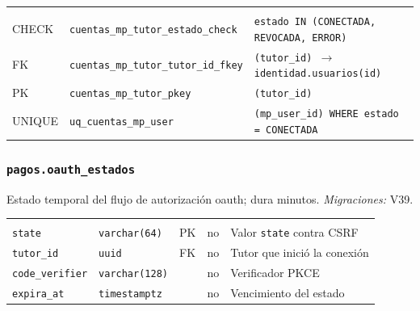 {\small
\begin{xltabular}{\textwidth}{@{}>{\raggedright\arraybackslash}p{1.7cm} >{\raggedright\arraybackslash}p{4.6cm} L@{}}
    \toprule
     &  &  \\
    \midrule
    \endfirsthead
    \toprule
     &  &  \\
    \midrule
    \endhead
    \bottomrule
    \endfoot
    CHECK & \texttt{cuentas\_\allowbreak{}mp\_\allowbreak{}tutor\_\allowbreak{}estado\_\allowbreak{}check} & \texttt{estado IN (\allowbreak{}\textquotesingle{}CONECTADA\textquotesingle{},\allowbreak{} \textquotesingle{}REVOCADA\textquotesingle{},\allowbreak{} \textquotesingle{}ERROR\textquotesingle{})} \\
    FK & \texttt{cuentas\_\allowbreak{}mp\_\allowbreak{}tutor\_\allowbreak{}tutor\_\allowbreak{}id\_\allowbreak{}fkey} & \texttt{(\allowbreak{}tutor\_\allowbreak{}id) $\rightarrow$ identidad.usuarios(\allowbreak{}id)} \\
    PK & \texttt{cuentas\_\allowbreak{}mp\_\allowbreak{}tutor\_\allowbreak{}pkey} & \texttt{(\allowbreak{}tutor\_\allowbreak{}id)} \\
    UNIQUE & \texttt{uq\_\allowbreak{}cuentas\_\allowbreak{}mp\_\allowbreak{}user} & \texttt{(\allowbreak{}mp\_\allowbreak{}user\_\allowbreak{}id) WHERE estado = \textquotesingle{}CONECTADA\textquotesingle{}} \\
\end{xltabular}
}

\subsubsection{\texorpdfstring{\texttt{pagos.oauth\_\allowbreak{}estados}}{pagos.oauth\_estados}}\label{dd:pagos.oauth_estados}

Estado temporal del flujo de autorización \gls{oauth}; dura minutos. \emph{Migraciones:} V39.

{\small
\begin{xltabular}{\textwidth}{@{}>{\raggedright\arraybackslash}p{3.6cm} >{\raggedright\arraybackslash}p{2.3cm} >{\raggedright\arraybackslash}p{1cm} >{\centering\arraybackslash}p{0.85cm} L@{}}
    \toprule
     &  &  &  &  \\
    \midrule
    \endfirsthead
    \toprule
     &  &  &  &  \\
    \midrule
    \endhead
    \bottomrule
    \endfoot
    \texttt{state} & \texttt{varchar(\allowbreak{}64)} & PK & no & Valor \texttt{state} contra CSRF \\
    \texttt{tutor\_\allowbreak{}id} & \texttt{uuid} & FK & no & Tutor que inició la conexión \\
    \texttt{code\_\allowbreak{}verifier} & \texttt{varchar(\allowbreak{}128)} &  & no & Verificador PKCE \\
    \texttt{expira\_\allowbreak{}at} & \texttt{timestamptz} &  & no & Vencimiento del estado \\
\end{xltabular}
}

